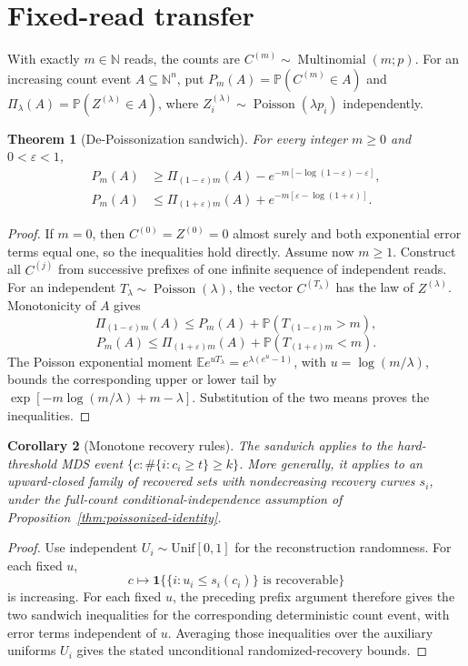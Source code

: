 \documentclass[11pt]{article}
\newtheorem{theorem}{Theorem}[section]
\newtheorem{corollary}[theorem]{Corollary}
\theoremstyle{definition}
\theoremstyle{remark}
\DeclareMathOperator{\Poisson}{Poisson}
\DeclareMathOperator{\Multinomial}{Multinomial}
\newcommand{\E}{\mathbb E}
\newcommand{\Pbb}{\mathbb P}
\newcommand{\N}{\mathbb N}
\newcommand{\1}{\mathbf 1}
\begin{document}
\section{Fixed-read transfer}
\label{sec:fixed-read}
With exactly \(m\in\N\) reads, the counts are
\(C^{(m)}\sim\Multinomial(m;p)\). For an increasing count event
\(A\subseteq\N^n\), put
\(P_m(A)=\Pbb(C^{(m)}\in A)\) and
\(\Pi_\lambda(A)=\Pbb(Z^{(\lambda)}\in A)\), where
\(Z_i^{(\lambda)}\sim\Poisson(\lambda p_i)\) independently.

\begin{theorem}[De-Poissonization sandwich]\label{thm:depoissonization}
For every integer \(m\ge0\) and \(0<\varepsilon<1\),
\begin{align*}
 P_m(A)&\ge\Pi_{(1-\varepsilon)m}(A)
        -e^{-m[-\log(1-\varepsilon)-\varepsilon]},\\
 P_m(A)&\le\Pi_{(1+\varepsilon)m}(A)
        +e^{-m[\varepsilon-\log(1+\varepsilon)]}.
\end{align*}
\end{theorem}
\begin{proof}
If \(m=0\), then \(C^{(0)}=Z^{(0)}=0\) almost surely and both
exponential error terms equal one, so the inequalities hold directly.
Assume now \(m\ge1\). Construct all \(C^{(j)}\) from successive
prefixes of one infinite
sequence of independent reads. For an independent
\(T_\lambda\sim\Poisson(\lambda)\), the vector
\(C^{(T_\lambda)}\) has the law of \(Z^{(\lambda)}\).
Monotonicity of \(A\) gives
\[
 \Pi_{(1-\varepsilon)m}(A)\le P_m(A)+\Pbb(T_{(1-\varepsilon)m}>m),
\]
\[
 P_m(A)\le\Pi_{(1+\varepsilon)m}(A)+\Pbb(T_{(1+\varepsilon)m}<m).
\]
The Poisson exponential moment
\(\E e^{uT_\lambda}=e^{\lambda(e^u-1)}\), with
\(u=\log(m/\lambda)\), bounds the corresponding upper or lower tail
by \(\exp[-m\log(m/\lambda)+m-\lambda]\).
Substitution of the two means proves the inequalities.
\end{proof}

\begin{corollary}[Monotone recovery rules]\label{cor:monotone-transfer}
The sandwich applies to the hard-threshold MDS event
\(\{c:\#\{i:c_i\ge t\}\ge k\}\). More generally, it applies to
an upward-closed family of recovered sets with nondecreasing recovery
curves \(s_i\), under the full-count conditional-independence assumption
of Proposition~\ref{thm:poissonized-identity}.
\end{corollary}
\begin{proof}
Use independent \(U_i\sim\mathrm{Unif}[0,1]\) for the reconstruction
randomness. For each fixed \(u\),
\[
 c\longmapsto\1\{\{i:u_i\le s_i(c_i)\}\text{ is recoverable}\}
\]
is increasing. For each fixed \(u\), the preceding prefix argument
therefore gives the two sandwich inequalities for the corresponding
deterministic count event, with error terms independent of \(u\).
Averaging those inequalities over the auxiliary uniforms \(U_i\)
gives the stated unconditional randomized-recovery bounds.
\end{proof}
\end{document}
